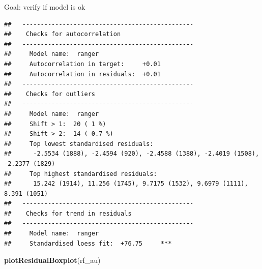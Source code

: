 \documentclass[]{krantz}
\newenvironment{Shaded}{\begin{snugshade}}{\end{snugshade}}
\newcommand{\ControlFlowTok}[1]{\textcolor[rgb]{0.13,0.29,0.53}{\textbf{#1}}}
\newcommand{\DataTypeTok}[1]{\textcolor[rgb]{0.13,0.29,0.53}{#1}}
\newcommand{\KeywordTok}[1]{\textcolor[rgb]{0.13,0.29,0.53}{\textbf{#1}}}
\newcommand{\NormalTok}[1]{#1}
\newcommand{\OperatorTok}[1]{\textcolor[rgb]{0.81,0.36,0.00}{\textbf{#1}}}
\newcommand{\StringTok}[1]{\textcolor[rgb]{0.31,0.60,0.02}{#1}}
\theoremstyle{definition}
\theoremstyle{definition}
\theoremstyle{definition}
\theoremstyle{remark}
\begin{document}
Goal: verify if model is ok

\citep{R-auditor}

\begin{Shaded}
\end{Shaded}

\begin{verbatim}
##   -----------------------------------------------
##    Checks for autocorrelation
##   -----------------------------------------------
##     Model name:  ranger 
##     Autocorrelation in target:     +0.01      
##     Autocorrelation in residuals:  +0.01      
##   -----------------------------------------------
##    Checks for outliers
##   -----------------------------------------------
##     Model name:  ranger 
##     Shift > 1:  20 ( 1 %) 
##     Shift > 2:  14 ( 0.7 %) 
##     Top lowest standardised residuals: 
##      -2.5534 (1888), -2.4594 (920), -2.4588 (1388), -2.4019 (1508), -2.2377 (1829) 
##     Top highest standardised residuals: 
##      15.242 (1914), 11.256 (1745), 9.7175 (1532), 9.6979 (1111), 8.391 (1051) 
##   -----------------------------------------------
##    Checks for trend in residuals
##   -----------------------------------------------
##     Model name:  ranger 
##     Standardised loess fit:  +76.75     ***
\end{verbatim}

\begin{Shaded}
\begin{Highlighting}[]
\KeywordTok{plotResidualBoxplot}\NormalTok{(rf_au)}
\end{Highlighting}
\end{Shaded}
\end{document}
